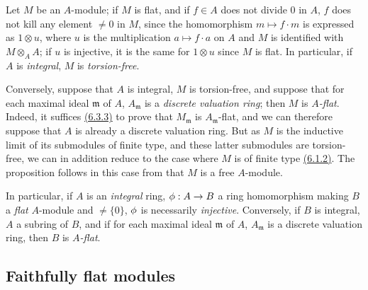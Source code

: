 \begin{env}[6.3.4]
\label{env-0.6.3.4}
Let $M$ be an $A$-module; if $M$ is flat, and if $f\in A$ does not divide $0$ in $A$, $f$
does not kill any element $\neq 0$ in $M$, since the homomorphism $m\mapsto f\cdot m$ is
expressed as $1\otimes u$, where $u$ is the multiplication $a\mapsto f\cdot a$ on $A$ and
$M$ is identified with $M\otimes_A A$; if $u$ is injective, it is the same for $1\otimes u$
since $M$ is flat. In particular, if $A$ is {\em integral}, $M$ is {\em torsion-free}.

Conversely, suppose that $A$ is integral, $M$ is torsion-free, and suppose that for each
maximal ideal $\mathfrak{m}$ of $A$, $A_\mathfrak{m}$ is a {\em discrete valuation ring};
then $M$ is {\em $A$-flat}. Indeed, it suffices \hyperref[env-0.6.3.3]{(6.3.3)} to prove that
$M_\mathfrak{m}$ is $A_\mathfrak{m}$-flat, and we can therefore suppose that $A$ is already
a discrete valuation ring. But as $M$ is the inductive limit of its submodules of finite
type, and these latter submodules are torsion-free, we can in addition reduce to the case
where $M$ is of finite type \hyperref[env-0.6.1.2]{(6.1.2)}. The proposition follows in this
case from that $M$ is a free $A$-module.

In particular, if $A$ is an {\em integral} ring, $\phi:A\to B$ a ring homomorphism making
$B$ a {\em flat} $A$-module and $\neq\{0\}$, $\phi$ is necessarily {\em injective}.
Conversely, if $B$ is integral, $A$ a subring of $B$, and if for each maximal ideal
$\mathfrak{m}$ of $A$, $A_\mathfrak{m}$ is a discrete valuation ring, then $B$ is
{\em $A$-flat}.
\end{env}

\subsection{Faithfully flat modules}
\label{subsection-faithfully-flat-modules}


